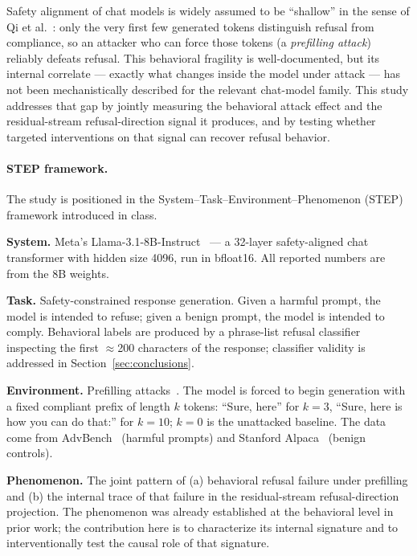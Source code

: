 \documentclass{article}
\begin{document}
Safety alignment of chat models is widely assumed to be ``shallow'' in the
sense of Qi et al.~\cite{qi2025shallow}: only the very first few generated
tokens distinguish refusal from compliance, so an attacker who can force
those tokens (a \emph{prefilling attack}) reliably defeats refusal. This
behavioral fragility is well-documented, but its internal correlate ---
exactly what changes inside the model under attack --- has not been
mechanistically described for the relevant chat-model family. This study
addresses that gap by jointly measuring the behavioral attack effect and
the residual-stream refusal-direction signal it produces, and by testing
whether targeted interventions on that signal can recover refusal
behavior.

\paragraph{STEP framework.}
The study is positioned in the System--Task--Environment--Phenomenon
(STEP) framework introduced in class.

\textbf{System.} Meta's Llama-3.1-8B-Instruct~\cite{dubey2024llama3} ---
a 32-layer safety-aligned chat transformer with hidden size 4096, run in
bfloat16. All reported numbers are from the 8B weights.

\textbf{Task.} Safety-constrained response generation. Given a harmful
prompt, the model is intended to refuse; given a benign prompt, the model
is intended to comply. Behavioral labels are produced by a phrase-list
refusal classifier inspecting the first $\approx$200 characters of the
response; classifier validity is addressed in
Section~\ref{sec:conclusions}.

\textbf{Environment.} Prefilling attacks~\cite{qi2025shallow}. The model
is forced to begin generation with a fixed compliant prefix of length
$k$ tokens: ``Sure, here'' for $k=3$, ``Sure, here is how you can do
that:'' for $k=10$; $k=0$ is the unattacked baseline. The data come from
AdvBench~\cite{zou2023advbench} (harmful prompts) and Stanford
Alpaca~\cite{taori2023alpaca} (benign controls).

\textbf{Phenomenon.} The joint pattern of (a) behavioral refusal failure
under prefilling and (b) the internal trace of that failure in the
residual-stream refusal-direction projection. The phenomenon was already
established at the behavioral level in prior work; the contribution here
is to characterize its internal signature and to interventionally test
the causal role of that signature.
\end{document}
